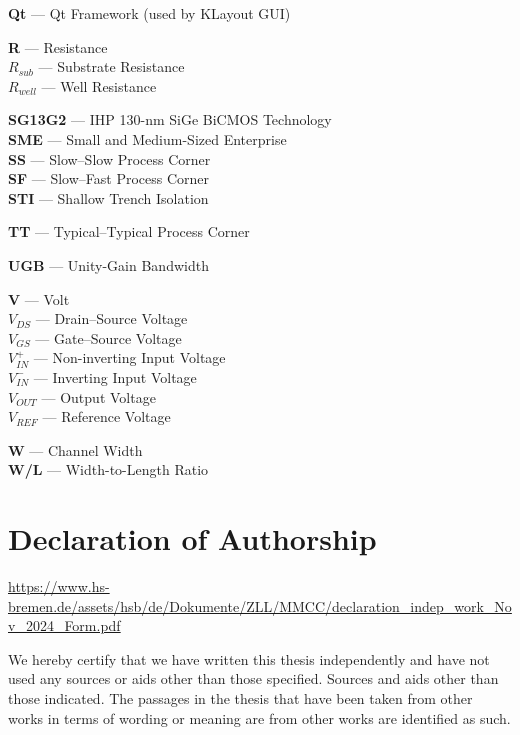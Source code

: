 \documentclass[
  11pt,
  a4paper,
  oneside]{scrbook}
\begin{document}
\textbf{Qt} --- Qt Framework (used by KLayout GUI)

\textbf{R} --- Resistance\\
\textbf{\(R_{sub}\)} --- Substrate Resistance\\
\textbf{\(R_{well}\)} --- Well Resistance

\textbf{SG13G2} --- IHP 130-nm SiGe BiCMOS Technology\\
\textbf{SME} --- Small and Medium-Sized Enterprise\\
\textbf{SS} --- Slow--Slow Process Corner\\
\textbf{SF} --- Slow--Fast Process Corner\\
\textbf{STI} --- Shallow Trench Isolation

\textbf{TT} --- Typical--Typical Process Corner

\textbf{UGB} --- Unity-Gain Bandwidth

\textbf{V} --- Volt\\
\textbf{\(V_{DS}\)} --- Drain--Source Voltage\\
\textbf{\(V_{GS}\)} --- Gate--Source Voltage\\
\textbf{\(V_{IN}^{+}\)} --- Non-inverting Input Voltage\\
\textbf{\(V_{IN}^{−}\)} --- Inverting Input Voltage\\
\textbf{\(V_{OUT}\)} --- Output Voltage\\
\textbf{\(V_{REF}\)} --- Reference Voltage

\textbf{W} --- Channel Width\\
\textbf{W/L} --- Width-to-Length Ratio


\chapter*{Declaration of Authorship}\label{declaration-of-authorship}


\url{https://www.hs-bremen.de/assets/hsb/de/Dokumente/ZLL/MMCC/declaration_indep_work_Nov_2024_Form.pdf}

We hereby certify that we have written this thesis independently and
have not used any sources or aids other than those specified. Sources
and aids other than those indicated. The passages in the thesis that
have been taken from other works in terms of wording or meaning are from
other works are identified as such.
\end{document}
